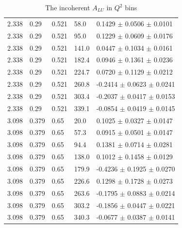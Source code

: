 \begin{table}[!h]
\begin{center}
\begin{tabular}{||l|l|l|l|l||}
   2.338 & 0.29 & 0.521  & 58.0  &  0.1429 $\pm$ 0.0506 $\pm$ 0.0101 \\
   2.338 & 0.29 & 0.521  & 95.0  &  0.1229 $\pm$ 0.0609 $\pm$ 0.0176 \\
   2.338 & 0.29 & 0.521  & 141.0 &  0.0447 $\pm$ 0.1034 $\pm$ 0.0161 \\
   2.338 & 0.29 & 0.521  & 182.4 &  0.0946 $\pm$ 0.1361 $\pm$ 0.0236 \\
   2.338 & 0.29 & 0.521  & 224.7 &  0.0720 $\pm$ 0.1129 $\pm$ 0.0212 \\
   2.338 & 0.29 & 0.521  & 260.8 & -0.2414 $\pm$ 0.0623 $\pm$ 0.0241 \\
   2.338 & 0.29 & 0.521  & 303.4 & -0.2037 $\pm$ 0.0417 $\pm$ 0.0153 \\
   2.338 & 0.29 & 0.521  & 339.1 & -0.0854 $\pm$ 0.0419 $\pm$ 0.0145 \\
  \hline                                                               
   3.098 &0.379 & 0.65   & 20.0  &  0.1025 $\pm$ 0.0327 $\pm$ 0.0147 \\
   3.098 &0.379 & 0.65   & 57.3  &  0.0915 $\pm$ 0.0501 $\pm$ 0.0147 \\
   3.098 &0.379 & 0.65   & 94.4  &  0.1381 $\pm$ 0.0714 $\pm$ 0.0281 \\
   3.098 &0.379 & 0.65   & 138.0 &  0.1012 $\pm$ 0.1458 $\pm$ 0.0129 \\
   3.098 &0.379 & 0.65   & 179.9 & -0.4236 $\pm$ 0.1925 $\pm$ 0.0270 \\
   3.098 &0.379 & 0.65   & 226.6 &  0.1298 $\pm$ 0.1728 $\pm$ 0.0273 \\
   3.098 &0.379 & 0.65   & 263.6 & -0.1795 $\pm$ 0.0883 $\pm$ 0.0214 \\
   3.098 &0.379 & 0.65   & 303.2 & -0.1856 $\pm$ 0.0447 $\pm$ 0.0221 \\
   3.098 &0.379 & 0.65   & 340.3 & -0.0677 $\pm$ 0.0387 $\pm$ 0.0141 \\
 \hline
 \hline
      \end{tabular}
      \caption{The incoherent $A_{LU}$ in $Q^2$ bins}
      \label{table:InCoh_Q2_BSA}
   \end{center}
\end{table}


